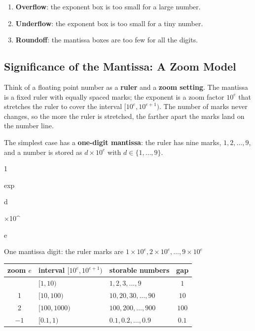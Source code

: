 \documentclass[
  letterpaper,
  DIV=11,
  numbers=noendperiod]{scrreprt}
\newcounter{none} %
\begin{document}
\begin{enumerate}
\def\labelenumi{\arabic{enumi}.}
\item
  \textbf{Overflow}: the exponent box is too small for a large number.
\item
  \textbf{Underflow}: the exponent box is too small for a tiny number.
\item
  \textbf{Roundoff}: the mantissa boxes are too few for all the digits.
\end{enumerate}

\subsection{Significance of the Mantissa: A Zoom
Model}\label{significance-of-the-mantissa-a-zoom-model}

Think of a floating point number as a \textbf{ruler} and a \textbf{zoom
setting}. The mantissa is a fixed ruler with equally spaced marks; the
exponent is a zoom factor \(10^{e}\) that stretches the ruler to cover
the interval \([10^{e}, 10^{e+1})\). The number of marks never changes,
so the more the ruler is stretched, the farther apart the marks land on
the number line.

The simplest case has a \textbf{one-digit mantissa}: the ruler has nine
marks, \(1, 2, \ldots, 9\), and a number is stored as \(d\times10^{e}\)
with \(d\in\{1,\ldots,9\}\).

1

exp

d

×10\^{}

e

One mantissa digit: the ruler marks are
\(1\times10^{e}, 2\times10^{e}, \ldots, 9\times10^{e}\)

{\def\LTcaptype{none} %
\begin{longtable}[]{@{}cllc@{}}
\toprule\noalign{}
zoom \(e\) & interval \([10^e, 10^{e+1})\) & storable numbers & gap \\
\midrule\noalign{}
\endhead
\bottomrule\noalign{}
\endlastfoot
0 & \([1, 10)\) & \(1, 2, 3, \ldots, 9\) & \(1\) \\
1 & \([10, 100)\) & \(10, 20, 30, \ldots, 90\) & \(10\) \\
2 & \([100, 1000)\) & \(100, 200, \ldots, 900\) & \(100\) \\
\(-1\) & \([0.1, 1)\) & \(0.1, 0.2, \ldots, 0.9\) & \(0.1\) \\
\end{longtable}
}
\end{document}
